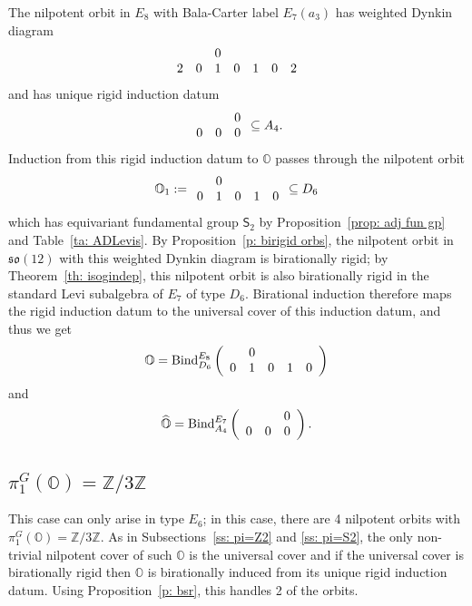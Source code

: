 \documentclass[11pt]{amsart}
\renewcommand{\O}{{\mathbb O}}
\newcommand{\bZ}{{\mathbb Z}}
\newcommand{\so}{{\mathfrak s}{\mathfrak o}}
\newcommand{\Sym}{{\mathsf{S}}}
\newcommand{\BInd}{{{\mbox{\rm Bind}}}}
\newcommand{\hatO}{\widehat{\O}}
\numberwithin{equation}{section}
\begin{document}
	The nilpotent orbit in $E_8$ with Bala-Carter label $E_7(a_3)$ has weighted Dynkin diagram
	$$\begin{array}{c c c c c c c}
		& & 0 & & & & \\
		2 & 0 & 1 & 0 & 1 & 0 & 2 \\
	\end{array}$$ and has unique rigid induction datum $$\begin{array}{c c c}
		&  & 0\\
		0 & 0 & 0 \\
	\end{array}\subseteq A_4.$$  Induction from this rigid induction datum to $\O$ passes through the nilpotent orbit $$\O_1:=\begin{array}{c c c c c c}
		& 0 & & & \\
		0 & 1 & 0 & 1 & 0  \\
	\end{array}\subseteq D_6$$ which has equivariant fundamental group $\Sym_2$ by Proposition~\ref{prop: adj fun gp} and Table~\ref{ta: ADLevis}. By Proposition~\ref{p: birigid orbs}, the nilpotent orbit in $\so(12)$ with this weighted Dynkin diagram is birationally rigid; by Theorem~\ref{th: isogindep}, this nilpotent orbit is also birationally rigid in the standard Levi subalgebra of $E_7$ of type $D_6$. Birational induction therefore maps the rigid induction datum to the universal cover of this induction datum, and thus we get $$\O=\BInd_{D_6}^{E_8}\left(\begin{array}{c c c c c c}
		& 0 & & & \\
		0 & 1 & 0 & 1 & 0  \\
	\end{array}\right)$$ and $$\hatO=\BInd_{A_4}^{E_7}\left(\begin{array}{c c c}
		&  & 0\\
		0 & 0 & 0 \\
	\end{array}\right).$$
	
	\subsection{\texorpdfstring{$\pi_1^G(\O)=\bZ/3\bZ$}{pi=Z3}}\label{ss: pi=Z3}
	
	This case can only arise in type $E_6$; in this case, there are 4 nilpotent orbits with $\pi_1^G(\O)=\bZ/3\bZ$. As in Subsections~\ref{ss: pi=Z2} and \ref{ss: pi=S2}, the only non-trivial nilpotent cover of such $\O$ is the universal cover and if the universal cover is birationally rigid then $\O$ is birationally induced from its unique rigid induction datum. Using Proposition~\ref{p: bsr}, this handles 2 of the orbits. 
	
\end{document}
